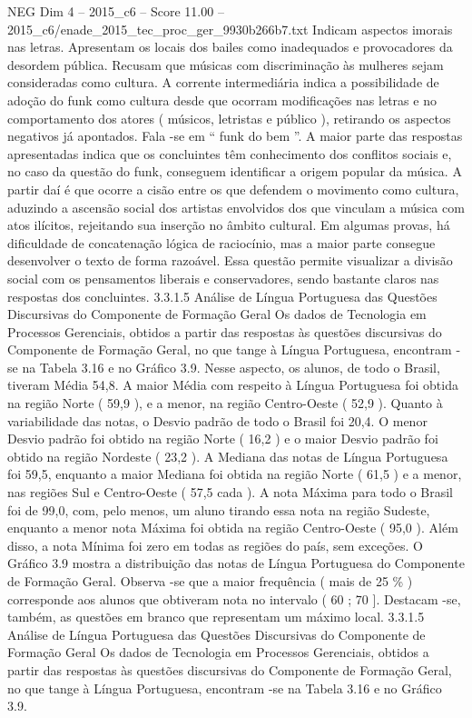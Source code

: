\begin{textsample}{NEG Dim 4 – 2015\_c6 – Score 11.00 – 2015\_c6/enade\_2015\_tec\_proc\_ger\_9930b266b7.txt}
Indicam aspectos imorais nas letras.
Apresentam os locais dos bailes como inadequados e provocadores da desordem pública.
Recusam que músicas com discriminação às mulheres sejam consideradas como cultura.
A corrente intermediária indica a possibilidade de adoção do funk como cultura desde que ocorram modificações nas letras e no comportamento dos atores ( músicos, letristas e público ), retirando os aspectos negativos já apontados.
Fala -se em “ funk do bem ”.
A maior parte das respostas apresentadas indica que os concluintes têm conhecimento dos conflitos sociais e, no caso da questão do funk, conseguem identificar a origem popular da música.
A partir daí é que ocorre a cisão entre os que defendem o movimento como cultura, aduzindo a ascensão social dos artistas envolvidos dos que vinculam a música com atos ilícitos, rejeitando sua inserção no âmbito cultural.
Em algumas provas, há dificuldade de concatenação lógica de raciocínio, mas a maior parte consegue desenvolver o texto de forma razoável.
Essa questão permite visualizar a divisão social com os pensamentos liberais e conservadores, sendo bastante claros nas respostas dos concluintes. 3.3.1.5 Análise de Língua Portuguesa das Questões Discursivas do Componente de Formação Geral Os dados de Tecnologia em Processos Gerenciais, obtidos a partir das respostas às questões discursivas do Componente de Formação Geral, no que tange à Língua Portuguesa, encontram -se na Tabela 3.16 e no Gráfico 3.9.
Nesse aspecto, os alunos, de todo o Brasil, tiveram Média 54,8.
A maior Média com respeito à Língua Portuguesa foi obtida na região Norte ( 59,9 ), e a menor, na região Centro-Oeste ( 52,9 ).
Quanto à variabilidade das notas, o Desvio padrão de todo o Brasil foi 20,4.
O menor Desvio padrão foi obtido na região Norte ( 16,2 ) e o maior Desvio padrão foi obtido na região Nordeste ( 23,2 ).
A Mediana das notas de Língua Portuguesa foi 59,5, enquanto a maior Mediana foi obtida na região Norte ( 61,5 ) e a menor, nas regiões Sul e Centro-Oeste ( 57,5 cada ).
A nota Máxima para todo o Brasil foi de 99,0, com, pelo menos, um aluno tirando essa nota na região Sudeste, enquanto a menor nota Máxima foi obtida na região Centro-Oeste ( 95,0 ).
Além disso, a nota Mínima foi zero em todas as regiões do país, sem exceções.
O Gráfico 3.9 mostra a distribuição das notas de Língua Portuguesa do Componente de Formação Geral.
Observa -se que a maior frequência ( mais de 25 \% ) corresponde aos alunos que obtiveram nota no intervalo ( 60 ; 70 ].
Destacam -se, também, as questões em branco que representam um máximo local. 3.3.1.5 Análise de Língua Portuguesa das Questões Discursivas do Componente de Formação Geral Os dados de Tecnologia em Processos Gerenciais, obtidos a partir das respostas às questões discursivas do Componente de Formação Geral, no que tange à Língua Portuguesa, encontram -se na Tabela 3.16 e no Gráfico 3.9.

\end{textsample}
